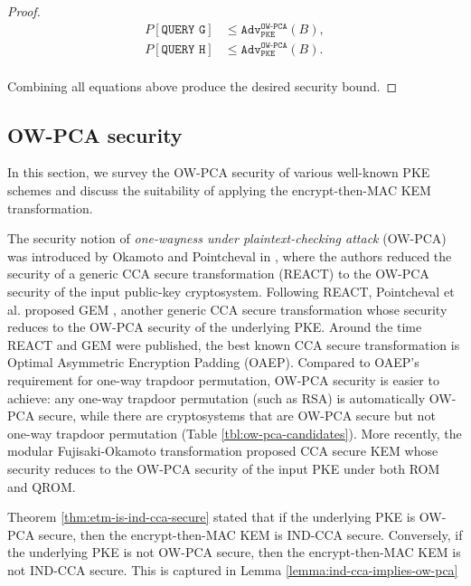 \documentclass[runningheads]{llncs}
\newcommand{\pke}{\texttt{PKE}}
\newcommand{\adv}{\texttt{Adv}}
\begin{document}
\begin{proof}
    \begin{equation*}
        \begin{aligned}
            P\left[\texttt{QUERY G}\right] &\leq \adv^\texttt{OW-PCA}_\pke(B), \\
            P\left[\texttt{QUERY H}\right] &\leq \adv^\texttt{OW-PCA}_\pke(B). \\
        \end{aligned}
    \end{equation*}

    Combining all equations above produce the desired security bound.
\end{proof}

\subsection{OW-PCA security}\label{sec:ow-pca-security}
In this section, we survey the OW-PCA security of various well-known PKE schemes and discuss the suitability of applying the encrypt-then-MAC KEM transformation. 

The security notion of \textit{one-wayness under plaintext-checking attack} (OW-PCA) was introduced by Okamoto and Pointcheval in \cite{DBLP:conf/ctrsa/OkamotoP01}, where the authors reduced the security of a generic CCA secure transformation (REACT) to the OW-PCA security of the input public-key cryptosystem. Following REACT, Pointcheval et al. proposed GEM \cite{DBLP:conf/ctrsa/CoronHJPPT02}, another generic CCA secure transformation whose security reduces to the OW-PCA security of the underlying PKE. Around the time REACT and GEM were published, the best known CCA secure transformation is Optimal Asymmetric Encryption Padding (OAEP)\cite{DBLP:conf/eurocrypt/BellareR94}. Compared to OAEP's requirement for one-way trapdoor permutation, OW-PCA security is easier to achieve: any one-way trapdoor permutation (such as RSA) is automatically OW-PCA secure, while there are cryptosystems that are OW-PCA secure but not one-way trapdoor permutation (Table \ref{tbl:ow-pca-candidates}). More recently, the modular Fujisaki-Okamoto transformation \cite{DBLP:conf/tcc/HofheinzHK17} proposed CCA secure KEM whose security reduces to the OW-PCA security of the input PKE under both ROM and QROM.

Theorem \ref{thm:etm-is-ind-cca-secure} stated that if the underlying PKE is OW-PCA secure, then the encrypt-then-MAC KEM is IND-CCA secure. Conversely, if the underlying PKE is not OW-PCA secure, then the encrypt-then-MAC KEM is not IND-CCA secure. This is captured in Lemma \ref{lemma:ind-cca-implies-ow-pca}
\end{document}
